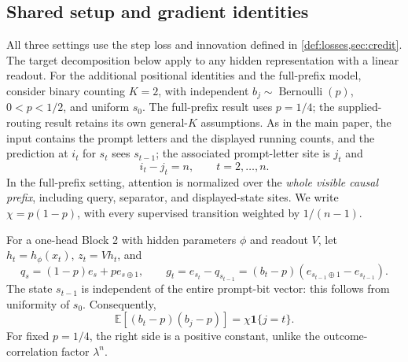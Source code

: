 \providecommand{\LRstep}{L_{\mathrm{step}}}
\providecommand{\LRout}{L_{\mathrm{out}}}
\providecommand{\LRsig}{\sigma}
\providecommand{\LRnorm}[1]{\left\lVert #1\right\rVert}
\providecommand{\LRinner}[2]{\left\langle #1,#2\right\rangle}
\theoremstyle{plain}
\newtheorem{lrlemma}[lemma]{Lemma}
\newtheorem{lrproposition}[proposition]{Proposition}
\newtheorem{lrtheorem}[theorem]{Theorem}
\newtheorem{lrremark}[remark]{Remark}

\subsection{Shared setup and gradient identities}
\label{app:weak-routing-initial}

All three settings use the step loss and innovation defined in
\cref{def:losses,sec:credit}. The target decomposition below
apply to any hidden representation with a linear readout. For the additional
positional identities and the full-prefix model, consider binary counting
$K=2$, with independent
$b_j\sim\operatorname{Bernoulli}(p)$, $0<p<1/2$, and uniform $s_0$.
The full-prefix result uses $p=1/4$; the supplied-routing result retains
its own general-$K$ assumptions. As in the main paper, the input
contains the prompt letters and the displayed running counts, and the
prediction at $i_t$ for $s_t$ sees $s_{t-1}$; the associated prompt-letter
site is $j_t$ and
\begin{equation}\label{eq:lr-constant-lag}
 i_t-j_t=n,\qquad t=2,\ldots,n.
\end{equation}
In the full-prefix setting, attention is normalized over the \emph{whole visible causal
prefix}, including query, separator, and displayed-state sites.  We write
$\chi=p(1-p)$, with every supervised transition weighted by $1/(n-1)$.

For a one-head Block 2 with hidden parameters $\phi$ and readout
$V$, let $h_t=h_\phi(x_t)$, $z_t=Vh_t$, and
\begin{equation}
 q_s=(1-p)e_s+pe_{s\oplus1},\qquad
 g_t=e_{s_t}-q_{s_{t-1}}=(b_t-p)(e_{s_{t-1}\oplus1}-e_{s_{t-1}}).
\end{equation}
The state $s_{t-1}$ is independent of the entire prompt-bit vector: this
follows from uniformity of $s_0$.  Consequently,
\begin{equation}\label{eq:lr-innovation-cov}
 \mathbb E[(b_t-p)(b_j-p)]=\chi\mathbf 1\{j=t\}.
\end{equation}
For fixed $p=1/4$, the right side is a positive constant, unlike the
outcome-correlation factor $\lambda^n$.


